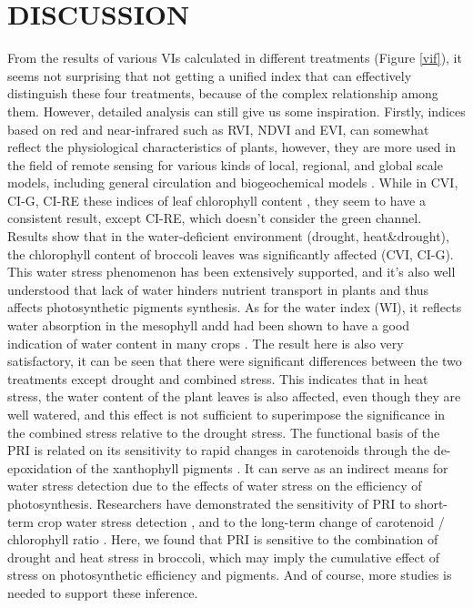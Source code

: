 \documentclass[12pt,a4paper]{article}
\begin{document}
\section{DISCUSSION}
From the results of various VIs calculated in different treatments (Figure \ref{vif}), it seems not surprising that not getting a unified index that can effectively distinguish these four treatments, because of the complex relationship among them. However, detailed analysis can still give us some inspiration. Firstly, indices based on red and near-infrared such as RVI, NDVI and EVI, can somewhat reflect the physiological characteristics of plants, however, they are more used in the field of remote sensing for various kinds of local, regional, and global scale models, including general circulation and biogeochemical models \citep{peterson1988remote,huete2002overview}. While in CVI, CI-G, CI-RE these indices of leaf chlorophyll content \citep{gitelson2003relationships,vincini2008broad}, they seem to have a consistent result, except CI-RE, which doesn't consider the green channel. Results show that in the water-deficient environment (drought, heat\&drought), the chlorophyll content of broccoli leaves was significantly affected (CVI, CI-G). This water stress phenomenon has been extensively supported, and it's also well understood that lack of water hinders nutrient transport in plants and thus affects photosynthetic pigments synthesis. As for the water index (WI), it reflects water absorption in the mesophyll andd had been shown to have a good indication of water content in many crops \citep{wang2015determining,dawson1999propagation,penuelas1997estimation}. The result here is also very satisfactory, it can be seen that there were significant differences between the two treatments except drought and combined stress. This indicates that in heat stress, the water content of the plant leaves is also affected, even though they are well watered, and this effect is not sufficient to superimpose the significance in the combined stress relative to the drought stress.  The functional basis of the PRI is related on its sensitivity to rapid changes in carotenoids through the de-epoxidation of the xanthophyll pigments \citep{magney2016response}. It can serve as an indirect means for water stress detection due to the effects of water stress on the efficiency of photosynthesis. Researchers have demonstrated the sensitivity of PRI to short-term crop water stress detection \citep{gamon1997photochemical,suarez2010orchard,zarco2013pri}, and to the long-term change of carotenoid / chlorophyll ratio \citep{mand2010responses}. Here, we found that PRI is sensitive to the combination of drought and heat stress in broccoli, which may imply the cumulative effect of stress on photosynthetic efficiency and pigments. And of course, more studies is needed to support these inference.
\end{document}
